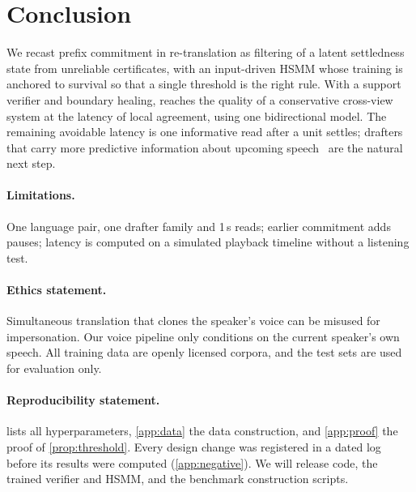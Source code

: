 \section{Conclusion}
\label{sec:conclusion}

We recast prefix commitment in re-translation as filtering of a latent settledness state from unreliable certificates, with an input-driven HSMM whose training is anchored to survival so that a single threshold is the right rule.
With a support verifier and boundary healing, \ours{} reaches the quality of a conservative cross-view system at the latency of local agreement, using one bidirectional model.
The remaining avoidable latency is one informative read after a unit settles; drafters that carry more predictive information about upcoming speech~\citep{gloeckle2024better} are the natural next step.

\paragraph{Limitations.}
One language pair, one drafter family and 1\,s reads; earlier commitment adds pauses; latency is computed on a simulated playback timeline without a listening test.

\paragraph{Ethics statement.}
Simultaneous translation that clones the speaker's voice can be misused for impersonation.
Our voice pipeline only conditions on the current speaker's own speech.
All training data are openly licensed corpora, and the test sets are used for evaluation only.

\paragraph{Reproducibility statement.}
 lists all hyperparameters, \cref{app:data} the data construction, and \cref{app:proof} the proof of \cref{prop:threshold}.
Every design change was registered in a dated log before its results were computed (\cref{app:negative}).
We will release code, the trained verifier and HSMM, and the benchmark construction scripts.
